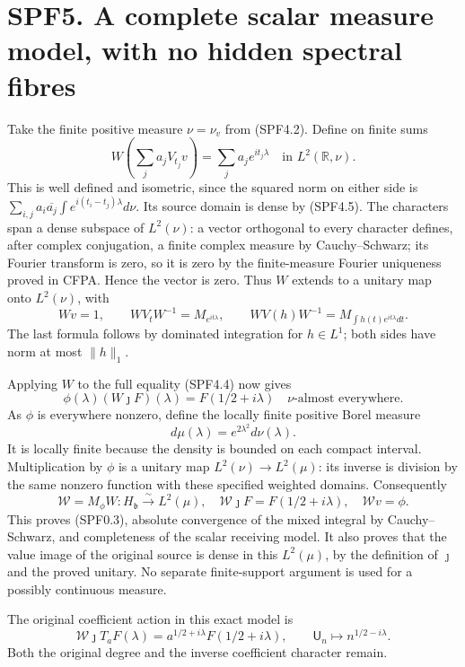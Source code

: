 \section{SPF5. A complete scalar measure model, with no hidden spectral
fibres}\label{spf5.-a-complete-scalar-measure-model-with-no-hidden-spectral-fibres}

Take the finite positive measure \(\nu=\nu_v\) from (SPF4.2). Define on
finite sums \[
W\left(\sum_j a_jV_{t_j}v\right)
=\sum_j a_je^{it_j\lambda}\quad\text{in }L^2(\mathbb R,\nu).
\tag{SPF5.1}
\] This is well defined and isometric, since the squared norm on either
side is \(\sum_{i,j}a_i\overline{a_j}\int e^{i(t_i-t_j)\lambda}d\nu\).
Its source domain is dense by (SPF4.5). The characters span a dense
subspace of \(L^2(\nu)\): a vector orthogonal to every character
defines, after complex conjugation, a finite complex measure by
Cauchy--Schwarz; its Fourier transform is zero, so it is zero by the
finite-measure Fourier uniqueness proved in CFPA. Hence the vector is
zero. Thus \(W\) extends to a unitary map onto \(L^2(\nu)\), with \[
Wv=1,\qquad WV_tW^{-1}=M_{e^{it\lambda}},\qquad
WV(h)W^{-1}=M_{\int h(t)e^{it\lambda}dt}.
\tag{SPF5.2}
\] The last formula follows by dominated integration for \(h\in L^1\);
both sides have norm at most \(\|h\|_1\).

Applying \(W\) to the full equality (SPF4.4) now gives \[
\phi(\lambda)(W\jmath F)(\lambda)=F(1/2+i\lambda)
\quad\nu\text{-almost everywhere}.
\tag{SPF5.3}
\] As \(\phi\) is everywhere nonzero, define the locally finite positive
Borel measure \[
\boxed{d\mu(\lambda)=e^{2\lambda^2}d\nu(\lambda).}
\tag{SPF5.4}
\] It is locally finite because the density is bounded on each compact
interval. Multiplication by \(\phi\) is a unitary map
\(L^2(\nu)\to L^2(\mu)\): its inverse is division by the same nonzero
function with these specified weighted domains. Consequently \[
\mathcal W=M_\phi W:H_{\mathfrak b}\xrightarrow{\sim}L^2(\mu),
\quad\mathcal W\jmath F=F(1/2+i\lambda),
\quad\mathcal Wv=\phi.
\tag{SPF5.5}
\] This proves (SPF0.3), absolute convergence of the mixed integral by
Cauchy--Schwarz, and completeness of the scalar receiving model. It also
proves that the value image of the original source is dense in this
\(L^2(\mu)\), by the definition of \(\jmath\) and the proved unitary. No
separate finite-support argument is used for a possibly continuous
measure.

The original coefficient action in this exact model is \[
\mathcal W\jmath T_aF(\lambda)
=a^{1/2+i\lambda}F(1/2+i\lambda),
\qquad
\mathsf U_n\longmapsto n^{1/2-i\lambda}.
\tag{SPF5.6}
\] Both the original degree and the inverse coefficient character
remain.

